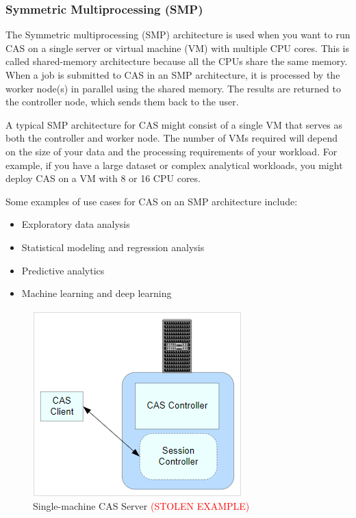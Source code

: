 \subsubsection{Symmetric Multiprocessing (SMP)}
The Symmetric multiprocessing (SMP) architecture is used when you want to run CAS on a single server or virtual machine (VM) with multiple CPU cores. This is called shared-memory architecture because all the CPUs share the same memory. When a job is submitted to CAS in an SMP architecture, it is processed by the worker node(s) in parallel using the shared memory. The results are returned to the controller node, which sends them back to the user.

A typical SMP architecture for CAS might consist of a single VM that serves as both the controller and worker node. The number of VMs required will depend on the size of your data and the processing requirements of your workload. For example, if you have a large dataset or complex analytical workloads, you might deploy CAS on a VM with 8 or 16 CPU cores.

Some examples of use cases for CAS on an SMP architecture include:

\begin{itemize}
    \item Exploratory data analysis
    \item Statistical modeling and regression analysis
    \item Predictive analytics
    \item Machine learning and deep learning
\end{itemize}

\begin{figure}[H]
    \centering
    \includegraphics[scale = 0.8]{images/smp_server.png}
    \caption{Single-machine CAS Server \textcolor{red}{(STOLEN EXAMPLE)} }
    \label{SMP Achitecture}
\end{figure}

